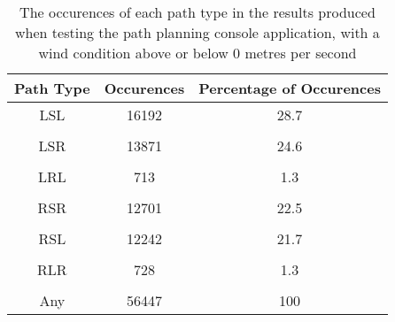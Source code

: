\begin{table}[h!]
\centering
\caption{The occurences of each path type in the results produced when testing the path planning console application, with a wind condition above or below 0 metres per second}
 \begin{tabular}{c | c | c}
	\hline
	\textbf{Path Type} & \textbf{Occurences} & \textbf{Percentage of Occurences} \\ 
	\hline
	\hline
	LSL & 16192 & 28.7\\
	\\
	LSR & 13871 & 24.6\\ 
	\\
	LRL & 713 & 1.3\\
	\\
	RSR & 12701 & 22.5\\
	\\
	RSL & 12242 & 21.7\\
	\\
	RLR & 728 & 1.3\\
	\\
	Any & 56447 & 100\\
	\hline
 \end{tabular}
\end{table}


